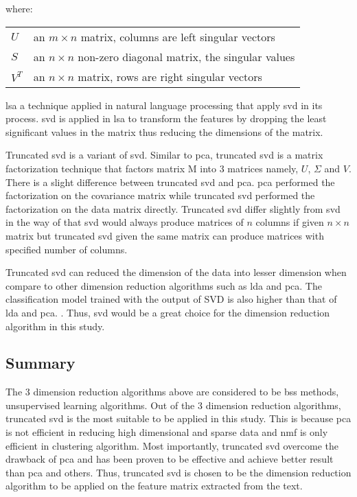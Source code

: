 where:
\begin{center}
	\begin{tabular}{l @{ $=$ } l}
		$U$ & an $m \times n$ matrix, columns are left singular vectors \\
		$S$ & an $n \times n$ non-zero diagonal matrix, the singular values \\
		$V^{T}$ & an $n \times n$ matrix, rows are right singular vectors \\
	\end{tabular}
\end{center}

	
\Ac{lsa} a technique applied in natural language processing that apply \ac{svd} in its process. \Ac{svd} is applied in \ac{lsa} to transform the features by dropping the least significant values in the matrix thus reducing the dimensions of the matrix. \cite{fuzzyLash}

Truncated \ac{svd} is a variant of \ac{svd}. Similar to \ac{pca}, truncated \ac{svd} is a matrix factorization technique that factors matrix M into 3 matrices namely, $U$, $\Sigma$ and $V$. There is a slight difference between truncated \ac{svd} and \ac{pca}. \Ac{pca} performed the factorization on the covariance matrix while truncated \ac{svd} performed the factorization on the data matrix directly. Truncated \ac{svd} differ slightly from \ac{svd} in the way of that \ac{svd} would always produce matrices of $n$ columns if given $n \times n$ matrix but truncated \ac{svd} given the same matrix can produce matrices with specified number of columns. \cite{truncatedSVD}

Truncated \ac{svd} can reduced the dimension of the data into lesser dimension when compare to other dimension reduction algorithms such as \ac{lda} and \ac{pca}. The classification model trained with the output of SVD is also higher than that of \ac{lda} and \ac{pca}. \cite{dimRedCat}. Thus, \ac{svd} would be a great choice for the dimension reduction algorithm in this study.\\
	
\subsection{Summary}
The 3 dimension reduction algorithms above are considered to be \ac{bss} methods, unsupervised learning algorithms. Out of the 3 dimension reduction algorithms, truncated \ac{svd} is the most suitable to be applied in this study. This is because \ac{pca} is not efficient in reducing high dimensional and sparse data and \ac{nmf} is only efficient in clustering algorithm. Most importantly, truncated \ac{svd} overcome the drawback of \ac{pca} and has been proven to be effective and achieve better result than \ac{pca} and others. Thus, truncated \ac{svd} is chosen to be the dimension reduction algorithm to be applied on the feature matrix extracted from the text.\\


